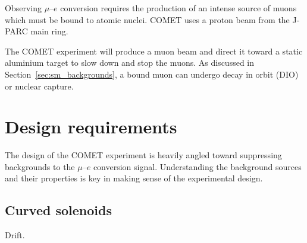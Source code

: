Observing $\mu$--$e$ conversion requires the production of an intense source of
muons which must be bound to atomic nuclei. COMET uses a proton beam from the
J-PARC main ring.


The COMET experiment will produce a
muon beam and direct it toward a static aluminium target to slow down and stop
the muons. As discussed in Section~\ref{sec:sm_backgrounds}, a bound muon can
undergo decay in orbit (DIO) or nuclear capture. 

\section{Design requirements}

The design of the COMET experiment is heavily angled toward suppressing
backgrounds to the $\mu$--$e$ conversion signal. Understanding the background
sources and their properties is key in making sense of the experimental design.

\subsection{Curved solenoids}\label{sec:curved_solenoids}
Drift.




